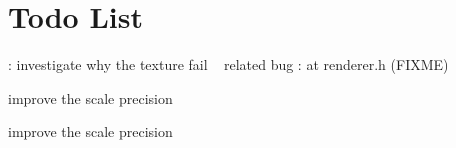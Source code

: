 \chapter{Todo List}
\hypertarget{todo}{}\label{todo}

\begin{DoxyRefList}
\item[Global \doxylink{classCanvasDriver_a48d9651696b1f66a6675bfb6bb7b28e7}{Canvas\+Driver\+::apply\+\_\+texture\+\_\+button} (const wx\+String \&image)]\label{todo__todo000001}%
%
\+: investigate why the texture fail ~\newline
 related bug \+: at renderer.\+h (FIXME)  
\item[Global \doxylink{classRenderer_aad725f02dbf870d6b24079769713aa1e}{Renderer\+::downscale} (void)]\label{todo__todo000003}%
%
improve the scale precision  
\item[Global \doxylink{classRenderer_a276415b914eebfe9f6874b40382ec34c}{Renderer\+::upscale} (void)]\label{todo__todo000002}%
%
improve the scale precision 
\end{DoxyRefList}